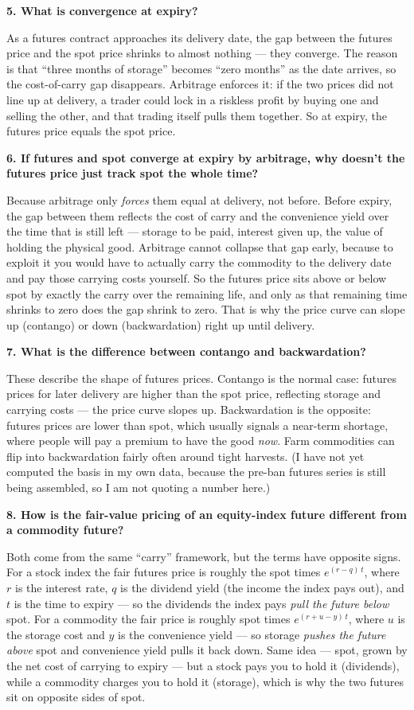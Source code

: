 \documentclass[11pt]{article}
\newcommand{\Q}[1]{\medskip\noindent\textbf{#1}\par}
\newcommand{\A}{\noindent}
\begin{document}
\Q{5. What is convergence at expiry?}
\A As a futures contract approaches its delivery date, the gap between the futures price and the spot
price shrinks to almost nothing --- they converge. The reason is that ``three months of storage''
becomes ``zero months'' as the date arrives, so the cost-of-carry gap disappears. Arbitrage enforces
it: if the two prices did not line up at delivery, a trader could lock in a riskless profit by buying
one and selling the other, and that trading itself pulls them together. So at expiry, the futures
price equals the spot price.

\Q{6. If futures and spot converge at expiry by arbitrage, why doesn't the futures price just track
spot the whole time?}
\A Because arbitrage only \emph{forces} them equal at delivery, not before. Before expiry, the gap
between them reflects the cost of carry and the convenience yield over the time that is still left ---
storage to be paid, interest given up, the value of holding the physical good. Arbitrage cannot
collapse that gap early, because to exploit it you would have to actually carry the commodity to the
delivery date and pay those carrying costs yourself. So the futures price sits above or below spot by
exactly the carry over the remaining life, and only as that remaining time shrinks to zero does the
gap shrink to zero. That is why the price curve can slope up (contango) or down (backwardation) right
up until delivery.

\Q{7. What is the difference between contango and backwardation?}
\A These describe the shape of futures prices. Contango is the normal case: futures prices for later
delivery are higher than the spot price, reflecting storage and carrying costs --- the price curve
slopes up. Backwardation is the opposite: futures prices are lower than spot, which usually signals a
near-term shortage, where people will pay a premium to have the good \emph{now}. Farm commodities can
flip into backwardation fairly often around tight harvests. (I have not yet computed the basis in my
own data, because the pre-ban futures series is still being assembled, so I am not quoting a number
here.)

\Q{8. How is the fair-value pricing of an equity-index future different from a commodity future?}
\A Both come from the same ``carry'' framework, but the terms have opposite signs. For a stock index
the fair futures price is roughly the spot times $e^{(r - q)\,t}$, where $r$ is the interest rate,
$q$ is the dividend yield (the income the index pays out), and $t$ is the time to expiry --- so the
dividends the index pays \emph{pull the future below} spot. For a commodity the fair price is roughly
spot times $e^{(r + u - y)\,t}$, where $u$ is the storage cost and $y$ is the convenience yield ---
so storage \emph{pushes the future above} spot and convenience yield pulls it back down. Same idea ---
spot, grown by the net cost of carrying to expiry --- but a stock pays you to hold it (dividends),
while a commodity charges you to hold it (storage), which is why the two futures sit on opposite
sides of spot.
\end{document}
